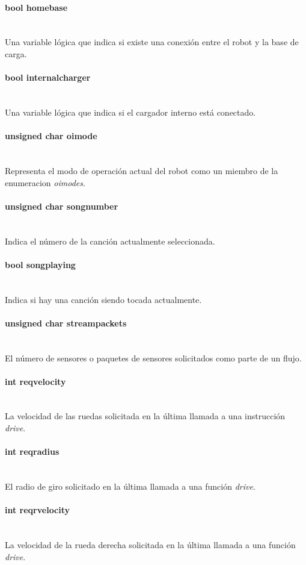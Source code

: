 \documentclass[letterpaper,openright,12pt]{book}
\begin{document}
\paragraph{bool homebase}\mbox{}\\
Una variable lógica que indica si existe una conexión entre el robot y la base de carga.
\paragraph{bool internalcharger}\mbox{}\\
Una variable lógica que indica si el cargador interno está conectado.
\paragraph{unsigned char oimode}\mbox{}\\
Representa el modo de operación actual del robot como un miembro de la enumeracion \emph{oimodes}.
\paragraph{unsigned char songnumber}\mbox{}\\
Indica el número de la canción actualmente seleccionada.
\paragraph{bool songplaying}\mbox{}\\
Indica si hay una canción siendo tocada actualmente.
\paragraph{unsigned char streampackets}\mbox{}\\
El número de sensores o paquetes de sensores solicitados como parte de un flujo.
\paragraph{int reqvelocity}\mbox{}\\
La velocidad de las ruedas solicitada en la última llamada a una instrucción \emph{drive}.
\paragraph{int reqradius}\mbox{}\\
El radio de giro solicitado en la última llamada a una función \emph{drive}.
\paragraph{int reqrvelocity}\mbox{}\\
La velocidad de la rueda derecha solicitada en la última llamada a una función \emph{drive}.
\end{document}
